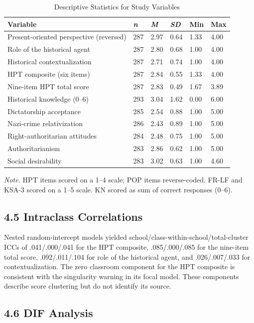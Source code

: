 \documentclass[PCJ,Unicode,screen,mode=plain]{cedram}
\begin{document}
\begin{longtable}[]{@{}llllll@{}}
\caption{Descriptive Statistics for Study Variables}\label{tab:2}\\
\toprule
Variable & \emph{n} & \emph{M} & \emph{SD} & Min & Max \\
\midrule
\endhead
\bottomrule
\endlastfoot
Present-oriented perspective (reversed) & 287 & 2.97 & 0.64 & 1.33 & 4.00 \\
Role of the historical agent & 287 & 2.80 & 0.68 & 1.00 & 4.00 \\
Historical contextualization & 287 & 2.71 & 0.74 & 1.00 & 4.00 \\
HPT composite (six items) & 287 & 2.84 & 0.55 & 1.33 & 4.00 \\
Nine-item HPT total score & 287 & 2.83 & 0.49 & 1.67 & 3.89 \\
Historical knowledge (0--6) & 293 & 3.04 & 1.62 & 0.00 & 6.00 \\
Dictatorship acceptance & 285 & 2.54 & 0.88 & 1.00 & 5.00 \\
Nazi-crime relativization & 286 & 2.43 & 0.89 & 1.00 & 5.00 \\
Right-authoritarian attitudes & 284 & 2.48 & 0.75 & 1.00 & 5.00 \\
Authoritarianism & 283 & 2.86 & 0.62 & 1.00 & 5.00 \\
Social desirability & 283 & 3.02 & 0.63 & 1.00 & 4.60 \\
\end{longtable}

\emph{Note.} HPT items scored on a 1--4 scale; POP items reverse-coded. FR-LF and KSA-3 scored on a 1--5 scale. KN scored as sum of correct responses (0--6).

\subsection*{4.5 Intraclass Correlations}\label{intraclass-correlations}

Nested random-intercept models yielded school/class-within-school/total-cluster
ICCs of .041/.000/.041 for the HPT composite,
.085/.000/.085 for the nine-item total score, .092/.011/.104 for role of the
historical agent, and .026/.007/.033 for contextualization. The zero classroom
component for the HPT composite is consistent with the singularity warning
in its focal model. These components describe score clustering but do not
identify its source.

\subsection*{4.6 DIF Analysis}\label{dif-analysis}
\end{document}
